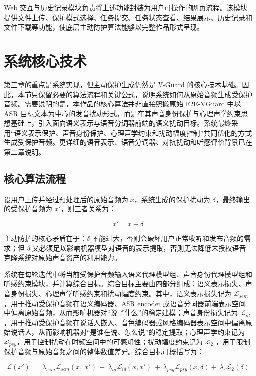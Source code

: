 Web
交互与历史记录模块负责将上述功能封装为用户可操作的网页流程。该模块提供文件上传、保护模式选择、任务提交、任务状态查看、结果展示、历史记录和文件下载等功能，使底层主动防护算法能够以完整作品形式呈现。

\section{系统核心技术}\label{ux7cfbux7edfux6838ux5fc3ux6280ux672f}

第三章的重点是系统实现，但主动保护生成仍然是 V-Guard
的核心技术基础。因此，本节只保留必要的算法流程和关键公式，说明系统如何从原始音频生成受保护音频。需要说明的是，本作品的核心算法并非直接照搬原始
E2E-VGuard 中以 ASR
目标文本为中心的发音扰动形式，而是在其声音身份保护与心理声学约束思想基础上，引入面向语义表示与语音分词器前端的语义扰动目标。系统最终采用``语义表示保护、声音身份保护、心理声学约束和扰动幅度控制''共同优化的方式生成受保护音频。更详细的语音表示、语音分词器、对抗扰动和听感评价背景已在第二章说明。

\subsection{核心算法流程}\label{ux6838ux5fc3ux7b97ux6cd5ux6d41ux7a0b}

设用户上传并经过预处理后的原始音频为 \(x\)，系统生成的保护扰动为
\(\delta\)，最终输出的受保护音频为 \(x'\)，则三者关系为：

\[x' = x + \delta\]

主动防护的核心矛盾在于：\(\delta\)
不能过大，否则会破坏用户正常收听和发布音频的需求；但 \(\delta\)
又必须足以影响机器模型对语音的表示提取，否则无法降低未授权语音克隆系统对原始声音资产的利用能力。

系统在每轮迭代中将当前受保护音频输入语义代理模型组、声音身份代理模型组和听感约束模块，并计算综合目标。综合目标主要由四部分组成：语义表示损失、声音身份损失、心理声学听感约束和扰动幅度约束。其中，语义表示损失记为
\(\mathcal{L}_{sem}\)，用于推动受保护音频在语义编码器、ASR encoder
或语音分词器前端表示空间中偏离原始音频，从而影响机器对``说了什么''的稳定建模；声音身份损失记为
\(\mathcal{L}_{id}\)，用于推动受保护音频在说话人嵌入、音色编码器或风格编码器表示空间中偏离原始说话人，从而影响机器对``是谁在说、怎么说''的稳定提取；心理声学约束记为
\(\mathcal{L}_{psy}\)，用于控制扰动在时频空间中的可感知性；扰动幅度约束记为
\(\mathcal{L}_{2}\)
，用于限制保护音频与原始音频之间的整体数值差异。综合目标可概括写为：

\[\mathcal{L}(x')\  = \ \lambda_{sem}\mathcal{L}_{sem}(x,\ x')\  + \ \lambda_{id}\mathcal{L}_{id}(x,x')\  + \ \lambda_{psy}\mathcal{L}_{psy}(x,\delta) + \ \lambda_{2}\mathcal{L}_{2}(\delta)\]

